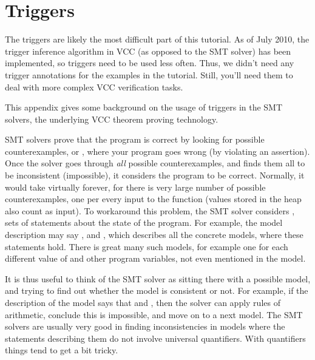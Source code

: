 \section{Triggers}


The triggers are likely the most difficult part of this tutorial.
As of July 2010, the trigger inference algorithm in VCC
(as opposed to the SMT solver)
has been implemented, so triggers need to be used less often.
Thus, we didn't need any trigger annotations for the examples
in the tutorial.
Still, you'll need them to deal with more complex VCC verification
tasks.

This appendix gives some background on the usage of triggers in the 
SMT solvers, the underlying VCC theorem proving technology.

SMT solvers
prove that the program is correct by looking for possible counterexamples,
or , where your program goes wrong (\eg by violating an assertion).
Once the solver goes through \emph{all} possible counterexamples, and finds them
all to be inconsistent (\ie impossible),
it considers the program to be correct.
Normally, it would take virtually forever, for there is very large number of
possible counterexamples, one per every input to the function (values stored in
the heap also count as input).
To workaround this problem, the SMT solver considers
, \ie 
sets of statements about the state of the program.
For example, the model description may say , 
and , which describes all the concrete models, where
these statements hold. There is great many such models,
for example one for each different value of  and other program variables,
not even mentioned in the model.

It is thus useful to think of the SMT solver as sitting there with
a possible model, and trying to find out whether the model is consistent or not.
For example, if the description of the model says that  and
, then the solver can apply rules of arithmetic, conclude this is
impossible, and move on to a next model.
The SMT solvers are usually very good in finding inconsistencies in models
where the statements describing them do not involve universal quantifiers.
With quantifiers things tend to get a bit tricky.

